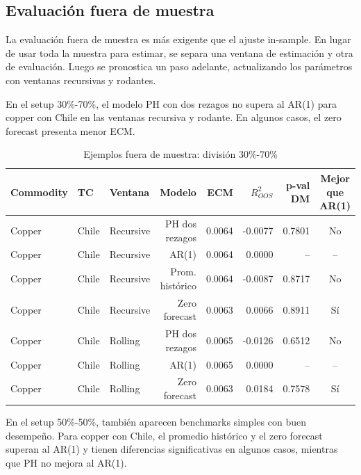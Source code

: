 \documentclass[11pt,a4paper]{article}
\begin{document}
\subsection{Evaluación fuera de muestra}

La evaluación fuera de muestra es más exigente que el ajuste in-sample. En lugar de usar toda la muestra para estimar, se separa una ventana de estimación y otra de evaluación. Luego se pronostica un paso adelante, actualizando los parámetros con ventanas recursivas y rodantes.

En el setup 30\%-70\%, el modelo PH con dos rezagos no supera al AR(1) para copper con Chile en las ventanas recursiva y rodante. En algunos casos, el zero forecast presenta menor ECM.

\begin{table}[H]
\centering
\caption{Ejemplos fuera de muestra: división 30\%-70\%}
\scriptsize
\begin{tabular}{lllrrrrc}
\toprule
Commodity & TC & Ventana & Modelo & ECM & $R^2_{OOS}$ & p-val DM & Mejor que AR(1) \\
\midrule
Copper & Chile & Recursive & PH dos rezagos & 0.0064 & -0.0077 & 0.7801 & No \\
Copper & Chile & Recursive & AR(1) & 0.0064 & 0.0000 & -- & -- \\
Copper & Chile & Recursive & Prom. histórico & 0.0064 & -0.0087 & 0.8717 & No \\
Copper & Chile & Recursive & Zero forecast & 0.0063 & 0.0066 & 0.8911 & Sí \\
Copper & Chile & Rolling & PH dos rezagos & 0.0065 & -0.0126 & 0.6512 & No \\
Copper & Chile & Rolling & AR(1) & 0.0065 & 0.0000 & -- & -- \\
Copper & Chile & Rolling & Zero forecast & 0.0063 & 0.0184 & 0.7578 & Sí \\
\bottomrule
\end{tabular}
\end{table}

En el setup 50\%-50\%, también aparecen benchmarks simples con buen desempeño. Para copper con Chile, el promedio histórico y el zero forecast superan al AR(1) y tienen diferencias significativas en algunos casos, mientras que PH no mejora al AR(1).
\end{document}
